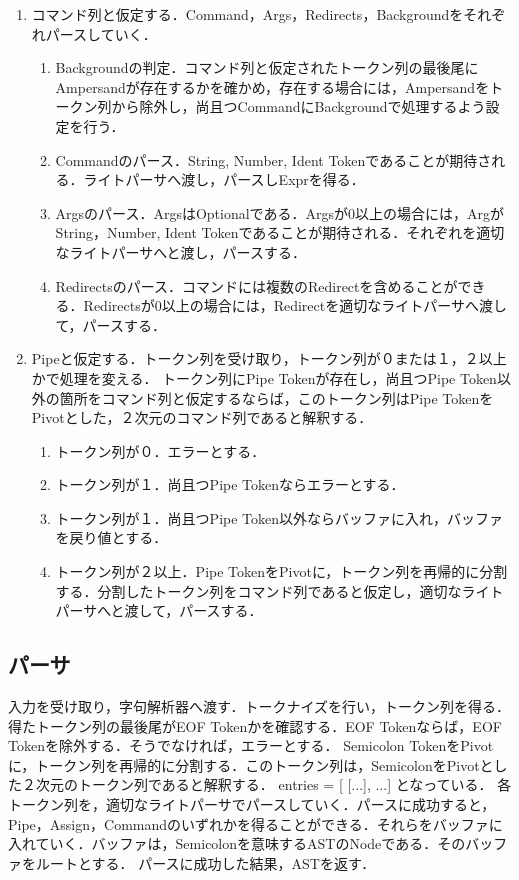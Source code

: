 \documentclass{article}
\begin{document}
\begin{enumerate}
\begin{enumerate}
    \end{enumerate}
    \item コマンド列と仮定する．Command，Args，Redirects，Backgroundをそれぞれパースしていく．
    \begin{enumerate}
        \item Backgroundの判定．コマンド列と仮定されたトークン列の最後尾にAmpersandが存在するかを確かめ，存在する場合には，Ampersandをトークン列から除外し，尚且つCommandにBackgroundで処理するよう設定を行う．
        \item Commandのパース．String, Number, Ident Tokenであることが期待される．ライトパーサへ渡し，パースしExprを得る．
        \item Argsのパース．ArgsはOptionalである．Argsが0以上の場合には，ArgがString，Number, Ident Tokenであることが期待される．それぞれを適切なライトパーサへと渡し，パースする．
        \item Redirectsのパース．コマンドには複数のRedirectを含めることができる．Redirectsが0以上の場合には，Redirectを適切なライトパーサへ渡して，パースする．
    \end{enumerate}
    \item Pipeと仮定する．トークン列を受け取り，トークン列が０または１，２以上かで処理を変える．\newline
    トークン列にPipe Tokenが存在し，尚且つPipe Token以外の箇所をコマンド列と仮定するならば，このトークン列はPipe TokenをPivotとした，２次元のコマンド列であると解釈する．
    \begin{enumerate}
        \item トークン列が０．エラーとする．
        \item トークン列が１．尚且つPipe Tokenならエラーとする．
        \item トークン列が１．尚且つPipe Token以外ならバッファに入れ，バッファを戻り値とする．
        \item トークン列が２以上．Pipe TokenをPivotに，トークン列を再帰的に分割する．分割したトークン列をコマンド列であると仮定し，適切なライトパーサへと渡して，パースする．
    \end{enumerate}
\end{enumerate}
\subsection{パーサ}
入力を受け取り，字句解析器へ渡す．トークナイズを行い，トークン列を得る．得たトークン列の最後尾がEOF Tokenかを確認する．EOF Tokenならば，EOF Tokenを除外する．そうでなければ，エラーとする．\newline
Semicolon TokenをPivotに，トークン列を再帰的に分割する．このトークン列は，SemicolonをPivotとした２次元のトークン列であると解釈する．\newline
entries = [ [...], ...] となっている．\newline
各トークン列を，適切なライトパーサでパースしていく．パースに成功すると，Pipe，Assign，Commandのいずれかを得ることができる．それらをバッファに入れていく．バッファは，Semicolonを意味するASTのNodeである．そのバッファをルートとする．\newline
パースに成功した結果，ASTを返す．
\end{document}
